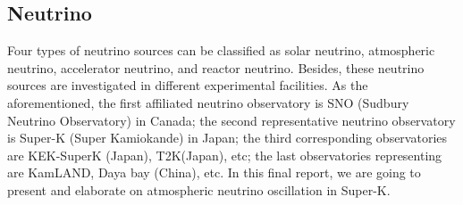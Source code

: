 \documentclass[12pt]{article}
\begin{document}
%
\setlength{\columnsep}{0.03\textwidth}
\begin{multicols}{2}
\thispagestyle{fancy}
    
\section{Neutrino}
    Four types of neutrino sources can be classified as solar neutrino, atmospheric neutrino, accelerator neutrino, and reactor neutrino. Besides, these neutrino sources are investigated in different experimental facilities. As the aforementioned, the first affiliated neutrino observatory is SNO (Sudbury Neutrino Observatory) in Canada; the second representative neutrino observatory is Super-K (Super Kamiokande) in Japan; the third corresponding observatories are KEK-SuperK (Japan), T2K(Japan), etc; the last observatories representing are KamLAND, Daya bay (China), etc. In this final report, we are going to present and elaborate on atmospheric neutrino oscillation in Super-K.


\end{multicols}
\end{document}
